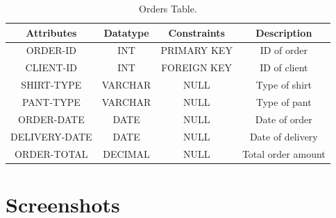 \documentclass[12pt, letter paper]{report}
\begin{document}
{\begin{center}
\begin{table}[h!]
\centering
    \begin{tabular}{|c|c|c|c|}
    \hline
      Attributes &Datatype &Constraints&Description  \\
      \hline
      \hline
         ORDER-ID&INT&PRIMARY KEY&ID of order \\
         \hline
         CLIENT-ID&INT&FOREIGN KEY&ID of client\\
         \hline
         SHIRT-TYPE&VARCHAR&NULL& Type of shirt\\ 
         \hline
         PANT-TYPE&VARCHAR&NULL& Type of pant\\ 
         \hline
         ORDER-DATE&DATE&NULL& Date of order\\
         \hline
         DELIVERY-DATE&DATE&NULL&Date of delivery\\
         \hline
         ORDER-TOTAL&DECIMAL&NULL&Total order amount\\
         \hline
    \end{tabular}
    \caption{Orders Table.}
\label{table:4}
    \end{table}
\end{center}

\chapter{Screenshots}

}
\end{document}
